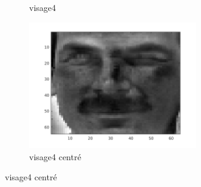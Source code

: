 \documentclass[a4paper]{article}
\begin{document}
\begin{figure}[H]
\begin{subfigure}[c]{0.24\textwidth}
        \caption{visage4}
        \label{subfig:ex1_x4}
    \end{subfigure}
    \begin{subfigure}[c]{0.24\textwidth}
        \centering
        \includegraphics[width=0.8\textwidth]{images/ex1_x4c.png}
        \caption{visage4 centré}
        \label{subfig:ex1_x4c}
    \end{subfigure}


\end{figure}
\end{document}
